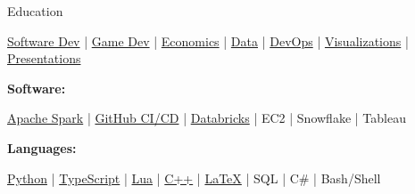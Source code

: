 \documentclass{content/resume/resume}
\begin{document}
\begin{rSection}{Education}
\begin{adjustwidth}{6em}{0pt}
  \href{https://spelkington.github.io/?search=Software}{Software Dev} |
  \href{https://spelkington.github.io/?search=Games}{Game Dev} |
  \href{https://spelkington.github.io/?search=Economics}{Economics} |
  \href{https://spelkington.github.io/?search=Data}{Data} | 
  \href{https://spelkington.github.io/?search=DevOps}{DevOps} |
  \href{https://spelkington.github.io/?search=Visualization}{Visualizations} |
  \href{https://spelkington.github.io/?search=Presentation}{Presentations}
  
\end{adjustwidth}


%
%
%
\vspace{-3pt}
{\bf Software:}
\vspace{-1.83em}
\begin{adjustwidth}{6em}{0pt}
  \href{https://spelkington.github.io/?search=Spark}{Apache Spark} | 
  \href{https://spelkington.github.io/?search=GitHub}{GitHub CI/CD} | 
  \href{https://spelkington.github.io/?search=Databricks}{Databricks} | 
  EC2 | 
  Snowflake | 
  Tableau

\end{adjustwidth}

\end{rSection}

%
%   
%
%
%
\vspace{-0.4em}
{\bf Languages:}
\vspace{-1.83em}
\begin{adjustwidth}{6em}{0pt}
  \href{https://spelkington.github.io/?search=Python}{Python} |
  \href{https://spelkington.github.io/?search=TypeScript}{TypeScript} | 
  \href{https://spelkington.github.io/?search=Lua}{Lua} | 
  \href{https://spelkington.github.io/?search=C++}{C++} |
  \href{https://spelkington.github.io/?search=LaTeX}{LaTeX} |
  SQL |
  C\# |
  Bash/Shell
\end{adjustwidth}
\end{document}
